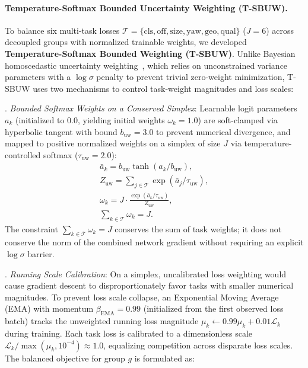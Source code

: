 \paragraph{Temperature-Softmax Bounded Uncertainty Weighting (T-SBUW).}
To balance six multi-task losses $\mathcal{T} = \{\mathrm{cls}, \mathrm{off}, \mathrm{size}, \mathrm{yaw}, \mathrm{geo}, \mathrm{qual}\}$ ($J=6$) across decoupled groups with normalized trainable weights, we developed \textbf{Temperature-Softmax Bounded Weighting (T-SBUW)}. Unlike Bayesian homoscedastic uncertainty weighting~\cite{kendall2018uncertainty}, which relies on unconstrained variance parameters with a $\log \sigma$ penalty to prevent trivial zero-weight minimization, T-SBUW uses two mechanisms to control task-weight magnitudes and loss scales:
\par{}. \textit{Bounded Softmax Weights on a Conserved Simplex}: Learnable logit parameters $a_k$ (initialized to $0.0$, yielding initial weights $\omega_k = 1.0$) are soft-clamped via hyperbolic tangent with bound $b_{\mathrm{uw}} = 3.0$ to prevent numerical divergence, and mapped to positive normalized weights on a simplex of size $J$ via temperature-controlled softmax ($\tau_{\mathrm{uw}} = 2.0$):
\begin{equation}
    \begin{gathered}
        \bar{a}_k = b_{\mathrm{uw}} \tanh(a_k / b_{\mathrm{uw}}), \\
        Z_{\mathrm{uw}} = \sum_{j \in \mathcal{T}} \exp(\bar{a}_j / \tau_{\mathrm{uw}}), \\
        \omega_k = J \cdot \frac{\exp(\bar{a}_k / \tau_{\mathrm{uw}})}{Z_{\mathrm{uw}}}, \\
        \sum_{k \in \mathcal{T}} \omega_k = J.
    \end{gathered}
    \label{eq:tsbuw_weights}
\end{equation}
The constraint $\sum_{k \in \mathcal{T}} \omega_k = J$ conserves the sum of task weights; it does not conserve the norm of the combined network gradient without requiring an explicit $\log \sigma$ barrier.
\par{}. \textit{Running Scale Calibration}: On a simplex, uncalibrated loss weighting would cause gradient descent to disproportionately favor tasks with smaller numerical magnitudes. To prevent loss scale collapse, an Exponential Moving Average (EMA) with momentum $\beta_{\mathrm{EMA}} = 0.99$ (initialized from the first observed loss batch) tracks the unweighted running loss magnitude $\mu_k \leftarrow 0.99\mu_k + 0.01\mathcal{L}_k$ during training. Each task loss is calibrated to a dimensionless scale $\mathcal{L}_k / \max(\mu_k, 10^{-4}) \approx 1.0$, equalizing competition across disparate loss scales. The balanced objective for group $g$ is formulated as:
